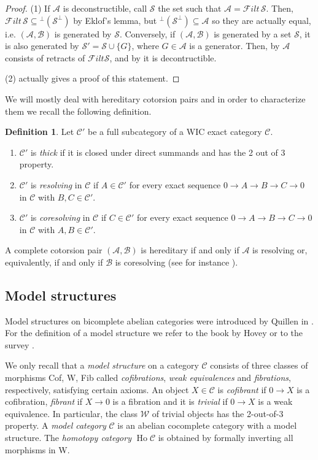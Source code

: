 \documentclass[11pt,a4paper,reqno]{amsart}
\renewcommand{\iff}{if and only if }
\newcommand{\A}{\mathcal{A}}
\newcommand{\B}{\mathcal{B}}
\newcommand{\C}{\mathcal{C}}
\newcommand{\F}{\mathcal{F}}
\newcommand{\clS}{\mathcal{S}}
\newcommand{\W}{\mathcal{W}}
\newcommand{\Ho}{\operatorname{Ho}}
\theoremstyle{plain}
\theoremstyle{definition}
\newtheorem{defn}[thm]{Definition}
\theoremstyle{remark}
\begin{document}
\begin{proof}
  (1) If $\A$ is deconstructible, call $\clS$ the set such that $\A = \F ilt\,\clS$. Then, $\F ilt\,\clS \subseteq {^\perp(\clS^\perp)}$ by Eklof's lemma, but ${^\perp(\clS^\perp)}\subseteq\A$ so they are actually equal, i.e. $(\A,\B)$ is generated by $\clS$.
  Conversely, if $(\A,\B)$ is generated by a set $\clS$, it is also generated by $\clS'=\clS\cup\{G\}$, where $G\in\A$ is a generator. Then, by \cite[Theorem~5.16]{Sto13} $\A$ consists of retracts of $\F ilt \clS$, and by \cite[Proposition~2.9(1)]{St10-deconstr} it is decontructible.

  (2) \cite[Theorem~5.16]{Sto13} actually gives a proof of this statement.
\end{proof}

%


We will mostly deal with  hereditary cotorsion pairs and
in order to characterize them we recall the following definition.
\begin{defn}\label{D:thick} Let $\C'$ be  a full subcategory of a WIC exact category $\C$.
\begin{enumerate}
\item $\C'$ is \emph{thick} if it is closed under direct summands and has the 2 out of 3 property.
\item $\C'$ is \emph{resolving} in $\C$ if $A\in \C'$ for every exact sequence $0\to A\to B\to C\to 0$ in $\C$ with $B, C\in \C'$.
\item $\C'$ is \emph{coresolving} in $\C$ if $C\in \C'$ for every exact sequence $0\to A\to B\to C\to 0$ in $\C$ with $A, B\in \C'$.
\end{enumerate}
\end{defn}

A complete cotorsion pair $(\A, \B)$ is hereditary \iff $\A$ is resolving or, equivalently, \iff $\B$ is coresolving  (see for instance \cite[Lemma 6.17]{Sto13}).

%
%
%

\subsection{Model structures}\label{S:model}
Model structures on bicomplete abelian categories were introduced by Quillen in \cite{QHtp}.
For the definition of a model structure we refer to the book by Hovey \cite{Hov99} or to the survey \cite{Sto13}.

We only recall that a \emph{model structure} on a category $\C$ consists
of three classes of morphisms Cof, W, Fib called \emph{cofibrations}, \emph{weak equivalences} and \emph{fibrations}, respectively, satisfying certain axioms. An object $X\in \C$ is \emph{cofibrant} if $0\to X$ is a cofibration,  \emph{fibrant} if $X\to 0$ is a fibration and it is \emph{trivial} if $0\to X$ is a weak equivalence.
In particular, the class $\W$ of trivial objects has the 2-out-of-3 property.
A \emph{model category} $\C$ is an abelian cocomplete category with a model structure.
 The \emph{homotopy category} $\Ho \C$ is obtained by  formally inverting all morphisms in W.
\end{document}
